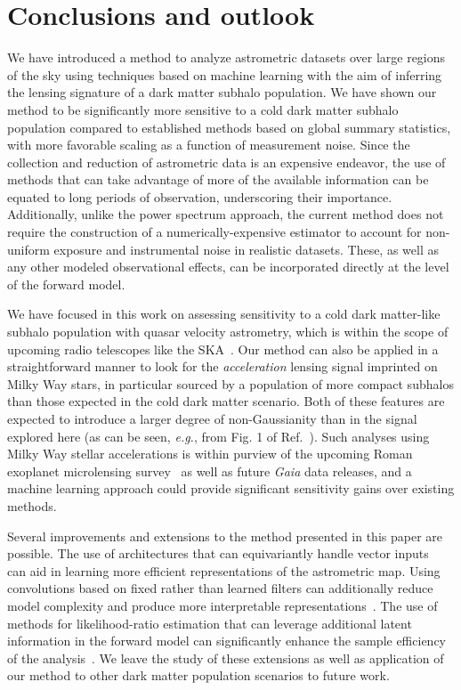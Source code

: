 \documentclass[preprint]{article}
\begin{document}
\section{Conclusions and outlook}
\label{sec:conclusions}

We have introduced a method to analyze astrometric datasets over large regions of the sky using techniques based on machine learning with the aim of inferring the lensing signature of a dark matter subhalo population. We have shown our method to be significantly more sensitive to a cold dark matter subhalo population compared to established methods based on global summary statistics, with more favorable scaling as a function of measurement noise. Since the collection and reduction of astrometric data is an expensive endeavor, the use of methods that can take advantage of more of the available information can be equated to long periods of observation, underscoring their importance. Additionally, unlike the power spectrum approach, the current method does not require the construction of a numerically-expensive estimator to account for non-uniform exposure and instrumental noise in realistic datasets. These, as well as any other modeled observational effects, can be incorporated directly at the level of the forward model. 

We have focused in this work on assessing sensitivity to a cold dark matter-like subhalo population with quasar velocity astrometry, which is within the scope of upcoming radio telescopes like the SKA~\cite{Fomalont:2004hr,Jarvis:2015tqa}. Our method can also be applied in a straightforward manner to look for the \emph{acceleration} lensing signal imprinted on Milky Way stars, in particular sourced by a population of more compact subhalos than those expected in the cold dark matter scenario. Both of these features are expected to introduce a larger degree of non-Gaussianity than in the signal explored here (as can be seen, \emph{e.g.}, from Fig. 1 of Ref.~\cite{Mishra-Sharma:2020ynk}). Such analyses using Milky Way stellar accelerations is within purview of the upcoming Roman exoplanet microlensing survey~\cite{Pardo:2021uzy} as well as future \emph{Gaia} data releases, and a machine learning approach could provide significant sensitivity gains over existing methods.

Several improvements and extensions to the method presented in this paper are possible. The use of architectures that can equivariantly handle vector inputs~\cite{esteves2020spinweighted} can aid in learning more efficient representations of the astrometric map. Using convolutions based on fixed rather than learned filters can additionally reduce model complexity and produce more interpretable representations~\cite{Cheng:2020qbx,2021arXiv210709145H,2021arXiv210411244S,2021arXiv210202828M,Valogiannis:2021chp}. The use of methods for likelihood-ratio estimation that can leverage additional latent information in the forward model can significantly enhance the sample efficiency of the analysis~\cite{Brehmer:2018eca,Brehmer:2018hga,Brehmer:2018kdj,Stoye:2018ovl}. We leave the study of these extensions as well as application of our method to other dark matter population scenarios to future work.
\end{document}
